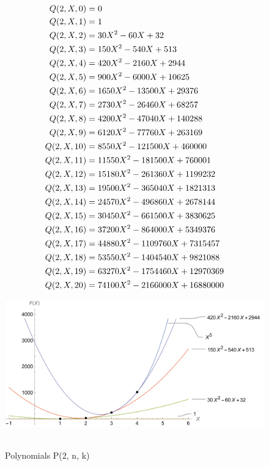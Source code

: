 ﻿\begin{align*}
    {Q}(2,X,0) &= 0 \\
    {Q}(2,X,1) &= 1 \\
    {Q}(2,X,2) &= 30X^2 - 60X + 32 \\
    {Q}(2,X,3) &= 150X^2 - 540X + 513 \\
    {Q}(2,X,4) &= 420X^2 - 2160X + 2944 \\
    {Q}(2,X,5) &= 900X^2 - 6000X + 10625 \\
    {Q}(2,X,6) &= 1650X^2 - 13500X + 29376 \\
    {Q}(2,X,7) &= 2730X^2 - 26460X + 68257 \\
    {Q}(2,X,8) &= 4200X^2 - 47040X + 140288 \\
    {Q}(2,X,9) &= 6120X^2 - 77760X + 263169 \\
    {Q}(2,X,10) &= 8550X^2 - 121500X + 460000 \\
    {Q}(2,X,11) &= 11550X^2 - 181500X + 760001 \\
    {Q}(2,X,12) &= 15180X^2 - 261360X + 1199232 \\
    {Q}(2,X,13) &= 19500X^2 - 365040X + 1821313 \\
    {Q}(2,X,14) &= 24570X^2 - 496860X + 2678144 \\
    {Q}(2,X,15) &= 30450X^2 - 661500X + 3830625 \\
    {Q}(2,X,16) &= 37200X^2 - 864000X + 5349376 \\
    {Q}(2,X,17) &= 44880X^2 - 1109760X + 7315457 \\
    {Q}(2,X,18) &= 53550X^2 - 1404540X + 9821088 \\
    {Q}(2,X,19) &= 63270X^2 - 1754460X + 12970369 \\
    {Q}(2,X,20) &= 74100X^2 - 2166000X + 16880000
\end{align*}
\begin{figure}[H]
    \centering
    \includegraphics[width=1\textwidth]{sections/images/04_fifth_power_with_q_1_n_k}
    ~\caption{Polynomials P(2, n, k)}\label{fig:figure4}
\end{figure}
